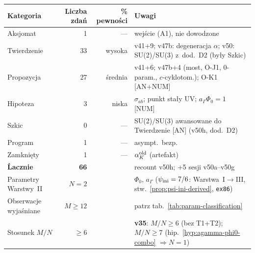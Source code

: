 \begin{center}\footnotesize
\begin{tabular}{@{}lrrl@{}}
\toprule
\textbf{Kategoria} & \textbf{Liczba zdań} & \textbf{\% pewności}
  & \textbf{Uwagi} \\
\midrule
Aksjomat              & 1  & --- & wej\'scie (A1), nie dowodzone \\
Twierdzenie           & 33 & wysoka & v41{+}9; v47b: degeneracja $\alpha$;
    v50: SU(2)/SU(3) z~dod.~D2 (by\l{}y Szkic) \\
Propozycja            & 27 & \'srednia & v41{+}6; v47b{+}4 (most, O-J1, 0-param., $c$-cyklotom.);
    O-K1 [AN+NUM] \\
Hipoteza              & 3  & niska & $\sigma_{ab}$; punkt sta\l{}y UV; $a_\Gamma\Phi_0{=}1$ [NUM] \\
Szkic                 & 0  & --- & SU(2)/SU(3) awansowane do Twierdzenie [AN] (v50h, dod.~D2) \\
Program               & 1  & --- & asympt.\ bezp. \\
Zamkni\k{e}ty        & 1  & --- & $\alpha_K^{\rm old}$ (artefakt) \\
\midrule
\textbf{\'Lacznie}   & \textbf{66} & & recount v50h; +5 sesji v50a--v50g \\
\midrule
Parametry Warstwy~II  & $N = 2$ & & $\Phi_0$, $a_\Gamma$
    ($\psi_{\rm ini}=7/6$: Warstwa~I$\to$III,
    stw.~\ref{prop:psi-ini-derived}, \texttt{ex86}) \\
Obserwacje wyja\'sniane & $M \geq 12$ & & patrz tab.~\ref{tab:param-classification} \\
Stosunek $M/N$        & $\geq 6$ & & \textbf{v35}: $M/N \geq 6$ (bez T1+T2);
    $M/N \geq 7$ (hip.~\ref{hyp:agamma-phi0-combo} $\Rightarrow N{=}1$) \\
\bottomrule
\end{tabular}
\end{center}

